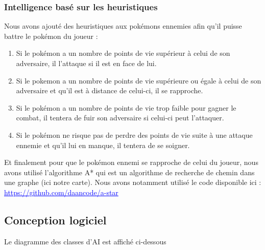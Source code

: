 \documentclass[a4paper,12pt]{article}
\begin{document}
    \subsubsection{Intelligence basé sur les heuristiques}
    
    Nous avons ajouté des heuristiques aux pokémons ennemies afin qu'il puisse battre le pokémon du joueur :\begin{enumerate}
        \item Si le pokémon a un nombre de points de vie supérieur à celui de son adversaire, il l'attaque si il est en face de lui. 
\item Si le pokemon a un nombre de points de vie supérieure ou égale à celui de son adversaire et qu'il est à distance de celui-ci, il se rapproche.
        \item Si le pokémon a un nombre de points de vie trop faible pour gagner le combat, il tentera de fuir son adversaire si celui-ci peut l'attaquer.
         \item Si le pokémon ne risque pas de perdre des points de vie suite à une attaque ennemie et qu'il lui en manque, il tentera de se soigner.
    \end{enumerate}
    Et finalement pour que le pokémon ennemi se rapproche de celui du joueur, nous avons utilisé l'algorithme A* qui est un algorithme de recherche de chemin dans une graphe (ici notre carte).
    Nous avons notamment utilisé le code disponible ici : \textcolor{blue}{\underline{ https://github.com/daancode/a-star}}
    
    
    \clearpage
    \subsection{Conception logiciel}
    
    Le diagramme des classes d'AI est affiché ci-dessous
    
\end{document}

